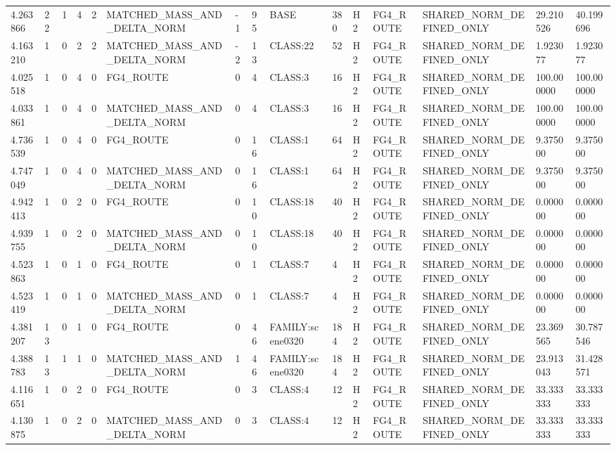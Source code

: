 \begin{tabular}{lllllllllllllll}
4.263866 & 22 & 1 & 4 & 2 & MATCHED\_MASS\_AND\_DELTA\_NORM & -1 & 95 & BASE & 380 & H2 & FG4\_ROUTE & SHARED\_NORM\_DEFINED\_ONLY & 29.210526 & 40.199696 \\
4.163210 & 1 & 0 & 2 & 2 & MATCHED\_MASS\_AND\_DELTA\_NORM & -2 & 13 & CLASS:22 & 52 & H2 & FG4\_ROUTE & SHARED\_NORM\_DEFINED\_ONLY & 1.923077 & 1.923077 \\
4.025518 & 1 & 0 & 4 & 0 & FG4\_ROUTE & 0 & 4 & CLASS:3 & 16 & H2 & FG4\_ROUTE & SHARED\_NORM\_DEFINED\_ONLY & 100.000000 & 100.000000 \\
4.033861 & 1 & 0 & 4 & 0 & MATCHED\_MASS\_AND\_DELTA\_NORM & 0 & 4 & CLASS:3 & 16 & H2 & FG4\_ROUTE & SHARED\_NORM\_DEFINED\_ONLY & 100.000000 & 100.000000 \\
4.736539 & 1 & 0 & 4 & 0 & FG4\_ROUTE & 0 & 16 & CLASS:1 & 64 & H2 & FG4\_ROUTE & SHARED\_NORM\_DEFINED\_ONLY & 9.375000 & 9.375000 \\
4.747049 & 1 & 0 & 4 & 0 & MATCHED\_MASS\_AND\_DELTA\_NORM & 0 & 16 & CLASS:1 & 64 & H2 & FG4\_ROUTE & SHARED\_NORM\_DEFINED\_ONLY & 9.375000 & 9.375000 \\
4.942413 & 1 & 0 & 2 & 0 & FG4\_ROUTE & 0 & 10 & CLASS:18 & 40 & H2 & FG4\_ROUTE & SHARED\_NORM\_DEFINED\_ONLY & 0.000000 & 0.000000 \\
4.939755 & 1 & 0 & 2 & 0 & MATCHED\_MASS\_AND\_DELTA\_NORM & 0 & 10 & CLASS:18 & 40 & H2 & FG4\_ROUTE & SHARED\_NORM\_DEFINED\_ONLY & 0.000000 & 0.000000 \\
4.523863 & 1 & 0 & 1 & 0 & FG4\_ROUTE & 0 & 1 & CLASS:7 & 4 & H2 & FG4\_ROUTE & SHARED\_NORM\_DEFINED\_ONLY & 0.000000 & 0.000000 \\
4.523419 & 1 & 0 & 1 & 0 & MATCHED\_MASS\_AND\_DELTA\_NORM & 0 & 1 & CLASS:7 & 4 & H2 & FG4\_ROUTE & SHARED\_NORM\_DEFINED\_ONLY & 0.000000 & 0.000000 \\
4.381207 & 13 & 0 & 1 & 0 & FG4\_ROUTE & 0 & 46 & FAMILY:scene0320 & 184 & H2 & FG4\_ROUTE & SHARED\_NORM\_DEFINED\_ONLY & 23.369565 & 30.787546 \\
4.388783 & 13 & 1 & 1 & 0 & MATCHED\_MASS\_AND\_DELTA\_NORM & 1 & 46 & FAMILY:scene0320 & 184 & H2 & FG4\_ROUTE & SHARED\_NORM\_DEFINED\_ONLY & 23.913043 & 31.428571 \\
4.116651 & 1 & 0 & 2 & 0 & FG4\_ROUTE & 0 & 3 & CLASS:4 & 12 & H2 & FG4\_ROUTE & SHARED\_NORM\_DEFINED\_ONLY & 33.333333 & 33.333333 \\
4.130875 & 1 & 0 & 2 & 0 & MATCHED\_MASS\_AND\_DELTA\_NORM & 0 & 3 & CLASS:4 & 12 & H2 & FG4\_ROUTE & SHARED\_NORM\_DEFINED\_ONLY & 33.333333 & 33.333333 \\

\end{tabular}
